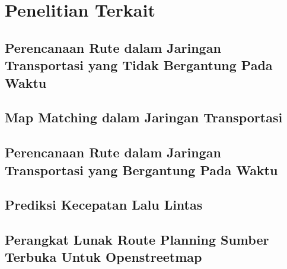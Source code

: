\documentclass[ugmskripsi]{ugmskripsi}
\begin{document}


\chapter{Penelitian Terkait}
\label{IDENTIFIIKASI MASALAH DAN IDE INOVATIF}

	\section{Perencanaan Rute dalam Jaringan Transportasi yang Tidak Bergantung Pada Waktu}
	\label{identifikasi masalah dan ide inovatif identifikasi masalah}
	

        \section{Map Matching dalam Jaringan Transportasi}
	\label{Map Matching dalam Jaringan Transportasi}
	

    \section{Perencanaan Rute dalam Jaringan Transportasi yang Bergantung Pada Waktu}
    \label{Perencanaan Rute dalam Jaringan Transportasi Bergantung Pada Waktu}
    

    \section{Prediksi Kecepatan Lalu Lintas}
    \label{Prediksi Kecepatan Lalu Lintas}
    

    \section{Perangkat Lunak Route Planning Sumber Terbuka Untuk Openstreetmap}
    \label{Perangkat Lunak Route Planning Sumber Terbuka}
    
\end{document}

